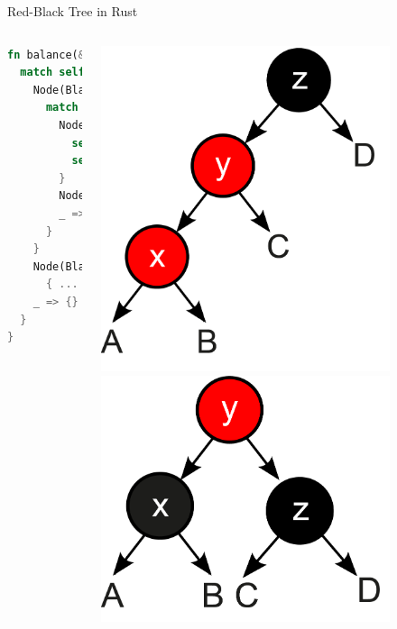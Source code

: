 \begin{frame}[fragile]{Red-Black Tree in Rust}
\begin{columns}
\begin{lstlisting}[language=Rust, caption={Balance imperatively}, basicstyle=\footnotesize\ttfamily,]
fn balance(&mut self) {
  match self {
    Node(Black, left, _, _) if left.is_red() => {
      match &mut **left {
        Node(Red, ll, _, _) if ll.is_red() => {
          self.rotate_right();
          self.recolor();
        }
        Node(Red, _, _, lr) if lr.is_red() => { ... }
        _ => {}
      }
    }
    Node(Black, _, _, right) if right.is_red() =>
      { ... }
    _ => {}
  }
}
\end{lstlisting}
\centering
\includegraphics[width=0.8\textwidth]{img/rbtree_case_1.png}
\vspace{1cm}
\includegraphics[width=0.8\textwidth]{img/rbtree_solution.png}
\end{columns}
\end{frame}


